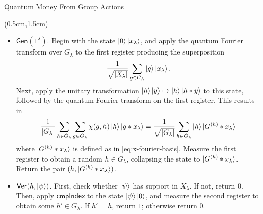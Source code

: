 \documentclass{beamer}
\theoremstyle{definition}
\newcommand{\comph}{\mathsf{cmpIndex}}
\newcommand{\gen}{\mathsf{Gen}}
\newcommand{\ver}{\mathsf{Ver}}
\begin{document}
\begin{frame}{Quantum Money From Group Actions}
    
    \begin{textblock*}{12cm}(0.5cm,1.5cm)
            
        
        \begin{itemize}
        \item $\gen(1^\lambda)$. Begin with the state $\ket{0}\ket{x_\lambda}$, and apply the quantum Fourier transform over $G_\lambda$ to the first register producing the superposition
        \[ \frac{1}{\sqrt{{|X_\lambda|}}} \sum_{g \in G_\lambda} \ket{g}\ket{x_\lambda}. \]
        Next, apply the unitary transformation $\ket{h}\ket{y} \mapsto \ket{h}\ket{h * y}$ to this state, followed by the quantum Fourier transform on the first register. This results in
        \[ \frac{1}{{|G_\lambda|}} \sum_{h \in G_\lambda} \sum_{g \in G_\lambda} \chi(g, h) \ket{h}\ket{g * x_\lambda} = \frac{1}{\sqrt{{|G_\lambda|}}} \sum_{h \in G_\lambda} \ket{h} \ket{G^{(h)} * x_\lambda} \]
        where $\ket{G^{(h)} * x_\lambda}$ is defined as in \eqref{eq:x-fourier-basis}. Measure the first register to obtain a random $h \in G_\lambda$, collapsing the state to $\ket{G^{(h)} * x_\lambda}$. Return the pair $(h, \ket{G^{(h)} * x_\lambda})$.

        \item $\ver(h, \ket{\psi})$. First, check whether $\ket{\psi}$ has support in $X_\lambda$. If not, return $0$. Then, apply $\comph$ to the state $\ket{\psi}\ket{0}$, and measure the second register to obtain some $h' \in G_\lambda$. If $h' = h$, return $1$; otherwise return $0$.
        \end{itemize}

        
       
        
    \end{textblock*}


\end{frame}
\end{document}
